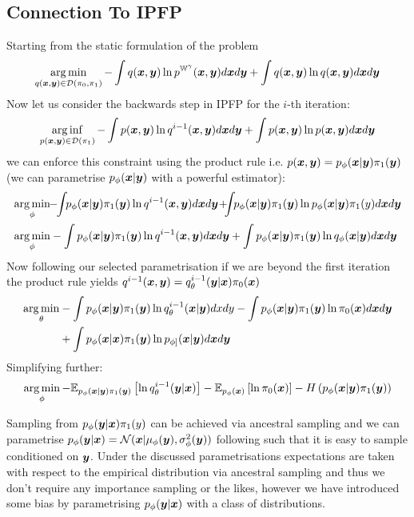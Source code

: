 \documentclass[a4paper,12pt,twoside,openright]{report}
\theoremstyle{definition}
\begin{document}
\subsection{Connection To IPFP}
Starting from the static formulation of the problem
\begin{align*}
\operatorname*{arg\,min}_{q({\bm{x}},{\bm{y}}) \in \mathcal{D}(\pi_0, \pi_1)}- \int q({\bm{x}},{\bm{y}}) \operatorname{ln} p^{\mathbb{W}^{\gamma}}({\bm{x}} ,{\bm{y}} )d{\bm{x}} d{\bm{y}} +\int q({\bm{x}},{\bm{y}}) \operatorname{ln} q({\bm{x}} ,{\bm{y}} )d{\bm{x}} d{\bm{y}}
\end{align*}
Now let us consider the backwards step in IPFP for the $i$-th iteration:
\begin{align*}
\operatorname*{arg\,inf}_{p({\bm{x}},{\bm{y}})  \in \mathcal{D}(\pi_1)}- \int p({\bm{x}},{\bm{y}})  \operatorname{ln} q^{i-1}({\bm{x}},{\bm{y}})d{\bm{x}} d{\bm{y}} +\int  p({\bm{x}},{\bm{y}}) \operatorname{ln}  p({\bm{x}},{\bm{y}}) d{\bm{x}} d{\bm{y}}
\end{align*}
we can enforce this constraint using the product rule i.e. $p({\bm{x}},{\bm{y}}) = p_{\phi}({\bm{x}}|{\bm{y}}) \pi_1({\bm{y}})$ (we can parametrise $p_{\phi}({\bm{x}}|{\bm{y}})$ with a powerful estimator):
\begin{align*}
\argmin_{\phi}&\!\!-\!\!\int\!\!p_{\phi}(\vx|\vy) \pi_1(\vy) \log q^{i-1}(\vx,\vy)d\vx d\vy\!+\!\!\!\int\!\!p_{\phi}(\vx|\vy) \pi_1(\vy) \log p_{\phi}(\vx|\vy)
\pi_1(y)d\vx d\vy\\
\argmin_{\phi}&- \int p_{\phi}(\vx|\vy) \pi_1(\vy) \log q^{i-1}(\vx,\vy)d\vx d\vy +\int p_{\phi}(\vx|\vy)\pi_1(\vy) \log q_{\phi}(\vx|\vy)
d\vx d\vy
\end{align*}
Now following our selected parametrisation if we are beyond the first iteration the product rule yields $q^{i-1}({\bm{x}} , {\bm{y}})= q^{i-1}_{\theta}({\bm{y}}|{\bm{x}})\pi_0({\bm{x}})$
\begin{align*}
\operatorname*{arg\,min}_\theta&- \int p_{\phi}({\bm{x}}|{\bm{y}}) \pi_1({\bm{y}}) \operatorname{ln}  q^{i-1}_{\theta}({\bm{x}}|{\bm{y}})dxdy - \int p_{\phi}({\bm{x}}|{\bm{y}}) \pi_1({\bm{y}}) \operatorname{ln}  \pi_0({\bm{x}}) d{\bm{x}} d{\bm{y}} \\
&+\int p_{\phi}({\bm{x}}|{\bm{x}}) \pi_1({\bm{y}}) \operatorname{ln} p_{\phi]}({\bm{x}}|{\bm{y}})d{\bm{x}} d{\bm{y}} 
\end{align*}
Simplifying further:
\begin{align*}
\operatorname*{arg\,min}_\phi- \mathbb{E}_{p_{\phi}({\bm{x}}|{\bm{y}})\pi_1({\bm{y}})}\left[  \operatorname{ln}  q^{i-1}_{\theta}({\bm{y}}|{\bm{x}})\right] -  \mathbb{E}_{p_{\phi}({\bm{x}})}\left[ \operatorname{ln}  \pi_0({\bm{x}}) \right] - H\left(p_{\phi}({\bm{x}}|{\bm{y}})\pi_1({\bm{y}})\right)
\end{align*}

Sampling from $p_{\phi}({\bm{y}}|{\bm{x}})\pi_1(y)$ can be achieved via  ancestral sampling and we can parametrise $p_{\phi}({\bm{y}}|{\bm{x}})=\mathcal{N}({\bm{x}} | \mu_{\phi}({\bm{y}}), \sigma^2_\phi({\bm{y}}))$ following \cite{kingma2013auto} such that it is easy to sample conditioned on ${\bm{y}}$. Under the discussed parametrisations expectations are taken with respect to the empirical distribution via ancestral sampling and thus we don't require any importance sampling or the likes, however we have introduced some bias by parametrising $p_{\phi}({\bm{y}}|{\bm{x}})$ with a class of distributions.
\end{document}
